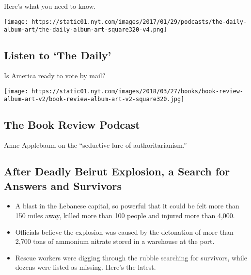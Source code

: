 Here's what you need to know.

\href{/2020/08/04/podcasts/the-daily/mail-in-voting-president-trump.html}{}

\texttt{[image: https://static01.nyt.com/images/2017/01/29/podcasts/the-daily-album-art/the-daily-album-art-square320-v4.png]}

\href{/2020/08/04/podcasts/the-daily/mail-in-voting-president-trump.html}{}

\hypertarget{listen-to-the-daily}{%
\subsection{Listen to `The Daily'}\label{listen-to-the-daily}}

Is America ready to vote by mail?

\href{/2020/07/31/books/review/podcast-twilight-democracy-anne-applebaum-eat-buddha-barbara-demick.html}{}

\texttt{[image: https://static01.nyt.com/images/2018/03/27/books/book-review-album-art-v2/book-review-album-art-v2-square320.jpg]}

\href{/2020/07/31/books/review/podcast-twilight-democracy-anne-applebaum-eat-buddha-barbara-demick.html}{}

\hypertarget{the-book-review-podcast}{%
\subsection{The Book Review Podcast}\label{the-book-review-podcast}}

Anne Applebaum on the ``seductive lure of authoritarianism.''

\href{/2020/08/05/world/middleeast/beirut-explosion.html}{}

\hypertarget{after-deadly-beirut-explosion-a-search-for-answers-and-survivors}{%
\subsection{After Deadly Beirut Explosion, a Search for Answers and
Survivors}\label{after-deadly-beirut-explosion-a-search-for-answers-and-survivors}}

\begin{itemize}
\tightlist
\item
  A blast in the Lebanese capital, so powerful that it could be felt
  more than 150 miles away, killed more than 100 people and injured more
  than 4,000.
\item
  Officials believe the explosion was caused by the detonation of more
  than 2,700 tons of ammonium nitrate stored in a warehouse at the port.
\item
  Rescue workers were digging through the rubble searching for
  survivors, while dozens were listed as missing. Here's the latest.
\end{itemize}

